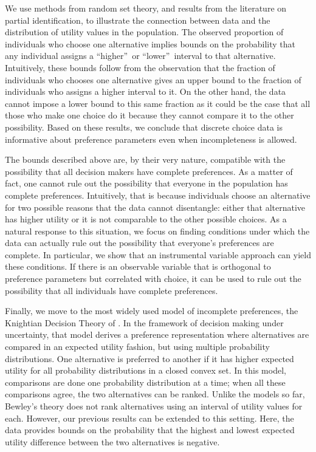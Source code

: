 \documentclass[reqno]{article}
\renewcommand{\cite}{\citet}
\begin{document}
We use methods from random set theory, and results from the literature on
partial identification, to illustrate the connection between data and the
distribution of utility values in the population. The observed proportion of
individuals who choose one alternative implies bounds on the probability
that any individual assigns a \textquotedblleft higher\textquotedblright\ or
\textquotedblleft lower\textquotedblright\ interval to that alternative.
Intuitively, these bounds follow from the observation that the fraction of
individuals who chooses one alternative gives an upper bound to the fraction
of individuals who assigns a higher interval to it. On the other hand, the
data cannot impose a lower bound to this same fraction as it could be the
case that all those who make one choice do it because they cannot compare it
to the other possibility. Based on these results, we conclude that discrete
choice data is informative about preference parameters even when
incompleteness is allowed.

The bounds described above are, by their very nature, compatible with the
possibility that all decision makers have complete preferences. As a matter
of fact, one cannot rule out the possibility that everyone in the population
has complete preferences. Intuitively, that is because individuals choose an
alternative for two possible reasons that the data cannot disentangle:
either that alternative has higher utility or it is not comparable to the
other possible choices. As a natural response to this situation, we focus on
finding conditions under which the data can actually rule out the
possibility that everyone's preferences are complete. In particular, we show
that an instrumental variable approach can yield these conditions. If there
is an observable variable that is orthogonal to preference parameters but
correlated with choice, it can be used to rule out the possibility that all
individuals have complete preferences.

Finally, we move to the most widely used model of incomplete preferences,
the Knightian Decision Theory of \cite{Bewley86}. In the framework of
decision making under uncertainty, that model derives a preference
representation where alternatives are compared in an expected utility
fashion, but using multiple probability distributions. One alternative is
preferred to another if it has higher expected utility for all probability
distributions in a closed convex set. In this model, comparisons are done
one probability distribution at a time; when all these comparisons agree,
the two alternatives can be ranked. Unlike the models so far, Bewley's
theory does not rank alternatives using an interval of utility values for
each. However, our previous results can be extended to this setting. Here,
the data provides bounds on the probability that the highest and lowest
expected utility difference between the two alternatives is negative.
\end{document}
